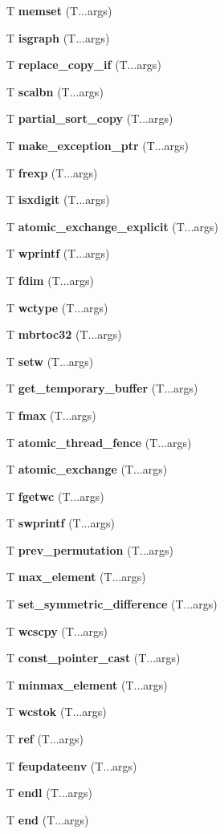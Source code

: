 \begin{DoxyCompactItemize}
\item 
T {\bf memset} (T...\+args)
\item 
T {\bf isgraph} (T...\+args)
\item 
T {\bf replace\+\_\+copy\+\_\+if} (T...\+args)
\item 
T {\bf scalbn} (T...\+args)
\item 
T {\bf partial\+\_\+sort\+\_\+copy} (T...\+args)
\item 
T {\bf make\+\_\+exception\+\_\+ptr} (T...\+args)
\item 
T {\bf frexp} (T...\+args)
\item 
T {\bf isxdigit} (T...\+args)
\item 
T {\bf atomic\+\_\+exchange\+\_\+explicit} (T...\+args)
\item 
T {\bf wprintf} (T...\+args)
\item 
T {\bf fdim} (T...\+args)
\item 
T {\bf wctype} (T...\+args)
\item 
T {\bf mbrtoc32} (T...\+args)
\item 
T {\bf setw} (T...\+args)
\item 
T {\bf get\+\_\+temporary\+\_\+buffer} (T...\+args)
\item 
T {\bf fmax} (T...\+args)
\item 
T {\bf atomic\+\_\+thread\+\_\+fence} (T...\+args)
\item 
T {\bf atomic\+\_\+exchange} (T...\+args)
\item 
T {\bf fgetwc} (T...\+args)
\item 
T {\bf swprintf} (T...\+args)
\item 
T {\bf prev\+\_\+permutation} (T...\+args)
\item 
T {\bf max\+\_\+element} (T...\+args)
\item 
T {\bf set\+\_\+symmetric\+\_\+difference} (T...\+args)
\item 
T {\bf wcscpy} (T...\+args)
\item 
T {\bf const\+\_\+pointer\+\_\+cast} (T...\+args)
\item 
T {\bf minmax\+\_\+element} (T...\+args)
\item 
T {\bf wcstok} (T...\+args)
\item 
T {\bf ref} (T...\+args)
\item 
T {\bf feupdateenv} (T...\+args)
\item 
T {\bf endl} (T...\+args)
\item 
T {\bf end} (T...\+args)
\item 

\end{DoxyCompactItemize}
